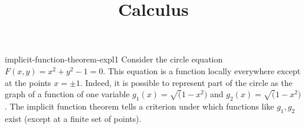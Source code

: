 \documentclass[preview]{standalone}
\begin{document}
\title{Calculus}
\genpage

\begin{snippet}{implicit-function-theorem-expl1}
    Consider the circle equation \(F(x,y)=x^2+y^2-1=0\).
    This equation is a function locally everywhere except at the points \(x=\pm 1\).
    Indeed, it is possible to represent part of the circle as the graph
    of a function of one variable \(g_1(x) = \sqrt(1-x^2)\) and
    \(g_2(x) = \sqrt(1-x^2)\).
    The implicit function theorem tells a criterion under which
    functions like \(g_1, g_2\) exist (except at a finite set of points). 
\end{snippet}
\end{document}

